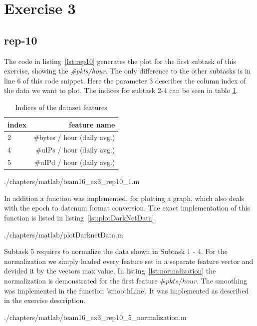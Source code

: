 \section*{Exercise 3}

\subsection*{rep-10}
The code in listing~\ref{lst:rep10} generates the plot for the first subtask of this exercise, showing the \textit{\#pkts/hour}. The only difference to the other subtasks is in line 6 of this code snippet. Here the parameter 3 describes the column index of the data we want to plot. The indices for subtask 2-4 can be seen in table \ref{tab:indices}.  
\begin{table}[H]
\center
\begin{tabular}{lr}
\toprule
index & feature name \\
\midrule
2 & \#bytes / hour (daily avg.) \\
4 & \#uIPs / hour (daily avg.) \\
5 & \#uIPd / hour (daily avg.) \\
\bottomrule
\end{tabular}
\caption{Indices of the dataset features}
\label{tab:indices}
\end{table}


				{./chapters/matlab/team16_ex3_rep10_1.m}
				

In addition a function was implemented, for plotting a graph, which also deals with the epoch to datenum format conversion. The exact implementation of this function is listed in listing~\ref{lst:plotDarkNetData}.


				{./chapters/matlab/plotDarknetData.m}

Subtask 5 requires to normalize the data shown in Subtask 1 - 4. For the normalization we simply loaded every feature set in a separate feature vector and devided it by the vectors max value. In listing~\ref{lst:normalization} the normalization is demonstrated for the first feature \(\#pkts/hour\). The smoothing was implemented in the function 'smoothLine'. It was implemented as described in the exercise description.


				{./chapters/matlab/team16_ex3_rep10_5_normalization.m}

